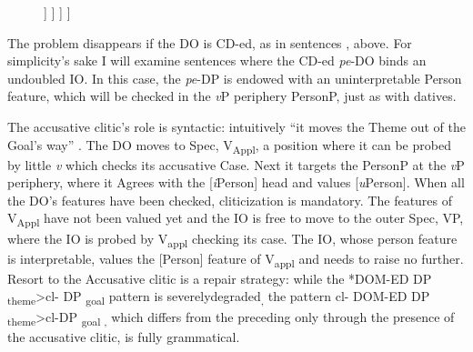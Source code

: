 \documentclass[output=paper,modfonts,nonflat,newtxmath]{langsci/langscibook}
\begin{document}
  \begin{figure}%
	\begin{forest}
		[\textit{v}P
			[\textit{v}
			]
			[V\textsubscript{Appl}P
				[V\textsubscript{Appl}\\
					{[}{\textit{u}}{Pers}{]}\\
					{[}\textit{u}Case:\textsc{acc}{]}
				]
				[VP
					[KP\textsubscript{DO}\\
						{[}{\textit{u}}{Pers}{]}
					]
					[V'
						[V\\
							{[}\textit{u}Case:Acc{]}
						]
						[KP\textsubscript{io}\\
							{[}{\textit{u}}{Pers}{]}\\
							{[}\textit{u}Case:Dat{]}
						]
					]
				]
			]
		]
	\end{forest}
	\caption{\label{fig:cornilescu:12} \missingcaption}
\end{figure}
      


The problem disappears if the DO is CD-ed, as in sentences ,  above. For simplicity’s sake I will examine sentences where the CD-ed \textit{pe}-DO binds an undoubled IO. In this case, the \textit{pe}-DP is endowed with an uninterpretable Person feature, which will be checked in the \textit{v}P periphery PersonP, just as with datives.

The accusative clitic’s role is syntactic: intuitively “it moves the Theme out of the Goal’s way” \citep{Anagnostopoulou2006}. The DO moves to Spec, V\textsubscript{Appl}, a position where it can be probed by little \textit{v} which checks its accusative Case. Next it targets the PersonP at the \textit{v}P periphery, where it Agrees with the [\textit{i}Person] head and values [\textit{u}Person]. When all the DO’s features have been checked, cliticization is mandatory. The features of V\textsubscript{Appl} have not been valued yet and the IO is free to move to the outer Spec, VP, where the IO is probed by V\textsubscript{appl} checking its case. The IO, whose person feature is interpretable, values the [Person] feature of V\textsubscript{appl} and needs to raise no further. Resort to the Accusative clitic is a repair strategy: while the *DOM-ED DP \textsubscript{theme}>{cl}{}- DP \textsubscript{goal} pattern is severelydegraded\textsubscript{,} the pattern {cl}{}- DOM-ED DP \textsubscript{theme}>{cl}{}-DP \textsubscript{goal ,} which differs from the preceding only through the presence of the accusative clitic, is fully grammatical.
\end{document}
